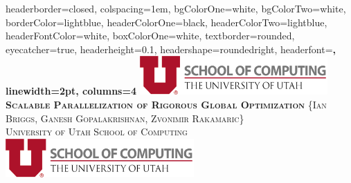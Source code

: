 \documentclass[landscape,a0paper,fontscale=0.32]{baposter} %
\begin{document}
\begin{poster}
{
headerborder=closed, %
colspacing=1em, %
bgColorOne=white, %
bgColorTwo=white, %
borderColor=lightblue, %
headerColorOne=black, %
headerColorTwo=lightblue, %
headerFontColor=white, %
boxColorOne=white, %
textborder=rounded,
eyecatcher=true, %
headerheight=0.1\textheight, %
headershape=roundedright,
headerfont=\Large\bf\textsc, %
linewidth=2pt, %
columns=4
}
{\includegraphics[height=4em]{left_logo}} %
{\bf\textsc{Scalable Parallelization of Rigorous Global Optimization}\vspace{0.5em}} %
{\textsc{ {\Large \{Ian Briggs, Ganesh Gopalakrishnan, Zvonimir Rakamaric\}}\\
    \hspace{12pt} University of Utah School of Computing}} %
{\includegraphics[height=4em]{right_logo}} %












\end{poster}
\end{document}
